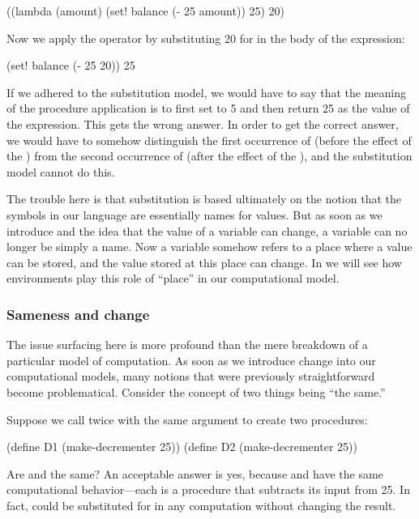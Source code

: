 \begin{codeBlock}
((lambda (amount) (set! balance (- 25 amount)) 25) 20)
\end{codeBlock}

\noindent
Now we apply the operator by substituting 20 for  in the body of
the  expression:

\begin{codeBlock}
(set! balance (- 25 20)) 25
\end{codeBlock}

\noindent
If we adhered to the substitution model, we would have to say that the meaning
of the procedure application is to first set  to 5 and then
return 25 as the value of the expression.  This gets the wrong answer.  In
order to get the correct answer, we would have to somehow distinguish the first
occurrence of  (before the effect of the )  from the
second occurrence of  (after the effect of the ), and
the substitution model cannot do this.

The trouble here is that substitution is based ultimately on the notion that
the symbols in our language are essentially names for values.  But as soon as
we introduce  and the idea that the value of a variable can change,
a variable can no longer be simply a name.  Now a variable somehow refers to a
place where a value can be stored, and the value stored at this place can
change.  In  we will see how environments play this role of
``place'' in our computational model.

\subsubsection*{Sameness and change}

The issue surfacing here is more profound than the mere breakdown of a
particular model of computation.  As soon as we introduce change into our
computational models, many notions that were previously straightforward become
problematical.  Consider the concept of two things being ``the same.''

Suppose we call  twice with the same argument to create
two procedures:

\begin{codeBlock}
(define D1 (make-decrementer 25))
(define D2 (make-decrementer 25))
\end{codeBlock}

\noindent
Are  and  the same?  An acceptable answer is yes, because
 and  have the same computational behavior---each is a
procedure that subtracts its input from 25.  In fact,  could be
substituted for  in any computation without changing the result.

